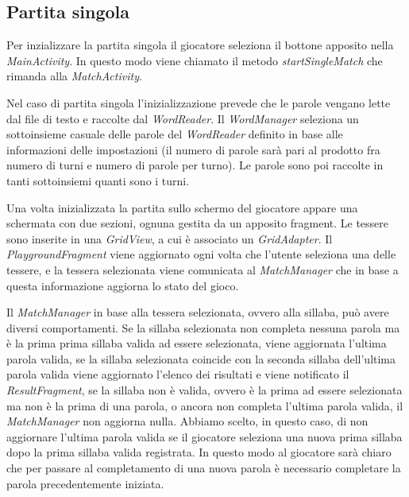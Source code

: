 
\subsection{Partita singola}
Per inzializzare la partita singola il giocatore seleziona il bottone apposito nella \emph{MainActivity}. In questo modo viene chiamato il metodo \emph{startSingleMatch} che rimanda alla \emph{MatchActivity}.

Nel caso di partita singola l'inizializzazione prevede che le parole vengano lette dal file di testo e raccolte dal \emph{WordReader}. Il \emph{WordManager} seleziona un sottoinsieme casuale delle parole del \emph{WordReader} definito in base alle informazioni delle impostazioni (il numero di parole sarà pari al prodotto fra numero di turni e numero di parole per turno). Le parole sono poi raccolte in tanti sottoinsiemi quanti sono i turni.


Una volta inizializzata la partita sullo schermo del giocatore appare una schermata con due sezioni, ognuna gestita da un apposito fragment. Le tessere sono inserite in una \emph{GridView}, a cui è associato un \emph{GridAdapter}. Il \emph{PlaygroundFragment} viene aggiornato ogni volta che l'utente seleziona una delle tessere, e la tessera selezionata viene comunicata al \emph{MatchManager} che in base a questa informazione aggiorna lo stato del gioco.

Il \emph{MatchManager} in base alla tessera selezionata, ovvero alla sillaba, può avere diversi comportamenti. Se la sillaba selezionata non completa nessuna parola ma è la prima prima sillaba valida ad essere selezionata, viene aggiornata l'ultima parola valida, se la sillaba selezionata coincide con la seconda sillaba dell'ultima parola valida viene aggiornato l'elenco dei risultati e viene notificato il \emph{ResultFragment}, se la sillaba non è valida, ovvero è la prima ad essere selezionata ma non è la prima di una parola, o ancora non completa l'ultima parola valida, il \emph{MatchManager} non aggiorna nulla. Abbiamo scelto, in questo caso, di non aggiornare l'ultima parola valida se il giocatore seleziona una nuova prima sillaba dopo la prima sillaba valida registrata. In questo modo al giocatore sarà chiaro che per passare al completamento di una nuova parola è necessario completare la parola precedentemente iniziata.

